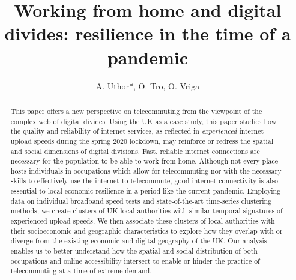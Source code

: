 \documentclass[Royal,times,sageh]{sagej}
\begin{document}
\title{Working from home and digital divides: resilience in the time of a
pandemic}

\runninghead{}

\author{A. Uthor*, O. Tro, O. Vriga}




\begin{abstract}
This paper offers a new perspective on telecommuting from the viewpoint
of the complex web of digital divides. Using the UK as a case study,
this paper studies how the quality and reliability of internet services,
as reflected in \emph{experienced} internet upload speeds during the
spring 2020 lockdown, may reinforce or redress the spatial and social
dimensions of digital divisions. Fast, reliable internet connections are
necessary for the population to be able to work from home. Although not
every place hosts individuals in occupations which allow for
telecommuting nor with the necessary skills to effectively use the
internet to telecommute, good internet connectivity is also essential to
local economic resilience in a period like the current pandemic.
Employing data on individual broadband speed tests and state-of-the-art
time-series clustering methods, we create clusters of UK local
authorities with similar temporal signatures of experienced upload
speeds. We then associate these clusters of local authorities with their
socioeconomic and geographic characteristics to explore how they overlap
with or diverge from the existing economic and digital geography of the
UK. Our analysis enables us to better understand how the spatial and
social distribution of both occupations and online accessibility
intersect to enable or hinder the practice of telecommuting at a time of
extreme demand.
\end{abstract}

\end{document}
